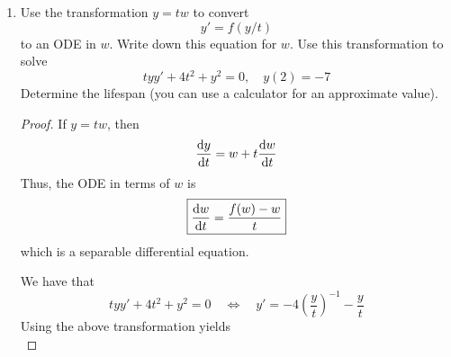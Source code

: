 \documentclass[../psets.tex]{subfiles}
\begin{document}
\begin{enumerate}
\begin{enumerate}
\begin{proof}
            Applying the chain rule, we have that
            \begin{equation*}
                \dv{E}{t} = mx'x''+kxx'
            \end{equation*}
            It follows that
            \begin{align*}
                \dv{E}{t} &= mx'(-\mu x'-\omega^2x)+kxx'\\
                &= x'(-bx'-kx)+kxx'\\
                &= -b(x')^2
            \end{align*}
            Now $x'\neq 0$ (as an exponential function). Hence, $(x')^2>0$. This and $b>0$ show that $\dv{E}{t}$ is always equal to a negative value. But this is characteristic of exponential decay, as desired.\par
            Mechanical energy is conserved; it is dispersed from system to surroundings by the drag $b$.
        \end{proof}
    \end{enumerate}
    \item Use the transformation $y=tw$ to convert
    \begin{equation*}
        y' = f(y/t)
    \end{equation*}
    to an ODE in $w$. Write down this equation for $w$. Use this transformation to solve
    \begin{equation*}
        tyy'+4t^2+y^2 = 0
        ,\quad
        y(2) = -7
    \end{equation*}
    Determine the lifespan (you can use a calculator for an approximate value).
    \begin{proof}
        If $y=tw$, then
        \begin{equation*}
            \dv{y}{t} = w+t\dv{w}{t}
        \end{equation*}
        Thus, the ODE in terms of $w$ is
        \begin{equation*}
            \boxed{\dv{w}{t} = \frac{f(w)-w}{t}}
        \end{equation*}
        which is a separable differential equation.\par
        We have that
        \begin{equation*}
            tyy'+4t^2+y^2 = 0
            \quad\Longleftrightarrow\quad
            y' = -4\left( \frac{y}{t} \right)^{-1}-\frac{y}{t}
        \end{equation*}
        Using the above transformation yields
        \begin{equation*}

\end{equation*}
\end{proof}
\end{enumerate}
\end{document}
